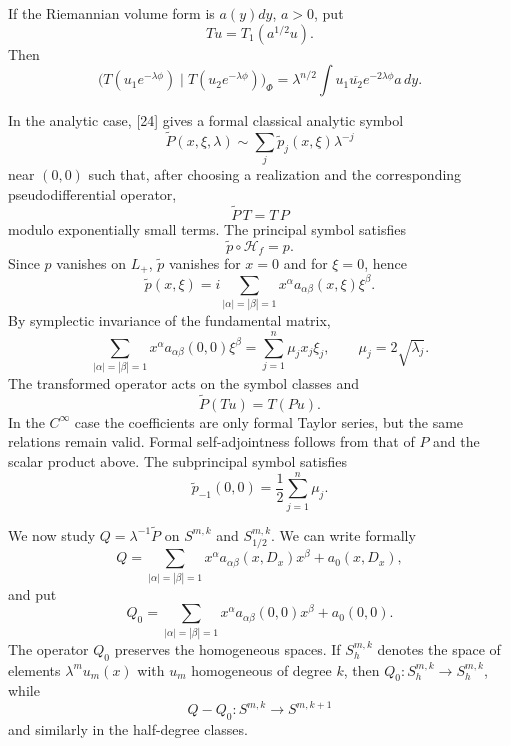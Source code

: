 \documentclass[11pt,a4paper]{article}
\numberwithin{equation}{section}
\theoremstyle{remark}
\begin{document}
If the Riemannian volume form is $a(y)dy$, $a>0$, put
\begin{equation}
Tu=T_1(a^{1/2}u).
\end{equation}
Then
\begin{equation}
\bigl(T(u_1e^{-\lambda\phi})\mid T(u_2e^{-\lambda\phi})\bigr)_\Phi
=\lambda^{n/2}\int u_1\overline{u_2}e^{-2\lambda\phi}a\,dy.
\tag{3.13'}
\end{equation}
\addtocounter{equation}{-1}

In the analytic case, [24] gives a formal classical analytic symbol
\[
\widetilde P(x,\xi,\lambda)\sim\sum_j\widetilde p_j(x,\xi)\lambda^{-j}
\]
near $(0,0)$ such that, after choosing a realization and the corresponding pseudodifferential operator,
\begin{equation}
\widetilde P\,T=T\,P
\end{equation}
modulo exponentially small terms. The principal symbol satisfies
\begin{equation}
\widetilde p\circ\mathcal H_f=p.
\end{equation}
Since $p$ vanishes on $L_+$, $\widetilde p$ vanishes for $x=0$ and for $\xi=0$, hence
\begin{equation}
\widetilde p(x,\xi)=i\sum_{|\alpha|=|\beta|=1}
x^\alpha a_{\alpha\beta}(x,\xi)\xi^\beta.
\end{equation}
By symplectic invariance of the fundamental matrix,
\begin{equation}
\sum_{|\alpha|=|\beta|=1}x^\alpha a_{\alpha\beta}(0,0)\xi^\beta
=\sum_{j=1}^n\mu_jx_j\xi_j,
\qquad \mu_j=2\sqrt{\lambda_j}.
\end{equation}
The transformed operator acts on the symbol classes and
\begin{equation}
\widetilde P(Tu)=T(Pu).
\end{equation}
In the $C^\infty$ case the coefficients are only formal Taylor series, but the same relations remain valid. Formal self-adjointness follows from that of $P$ and the scalar product above. The subprincipal symbol satisfies
\begin{equation}
\widetilde p_{-1}(0,0)=\frac12\sum_{j=1}^n\mu_j.
\end{equation}

We now study $Q=\lambda^{-1}\widetilde P$ on $S^{m,k}$ and $S_{1/2}^{m,k}$. We can write formally
\[
Q=\sum_{|\alpha|=|\beta|=1}x^\alpha a_{\alpha\beta}(x,D_x)x^\beta+a_0(x,D_x),
\]
and put
\[
Q_0=\sum_{|\alpha|=|\beta|=1}x^\alpha a_{\alpha\beta}(0,0)x^\beta+a_0(0,0).
\]
The operator $Q_0$ preserves the homogeneous spaces. If $S_h^{m,k}$ denotes the space of elements $\lambda^m u_m(x)$ with $u_m$ homogeneous of degree $k$, then $Q_0:S_h^{m,k}\to S_h^{m,k}$, while
\[
Q-Q_0:S^{m,k}\to S^{m,k+1}
\]
and similarly in the half-degree classes.
\end{document}
